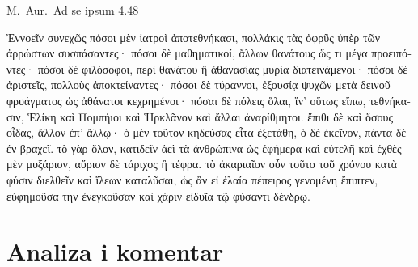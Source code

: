 M.~Aur.\ Ad se ipsum 4.48


\medskip


{\large

\begin{greek}

\noindent  Ἐννοεῖν συνεχῶς πόσοι μὲν ἰατροὶ ἀποτεθνήκασι, πολλάκις τὰς ὀφρῦς ὑπὲρ τῶν ἀρρώστων συσπάσαντες· πόσοι δὲ μαθηματικοί, ἄλλων θανάτους ὥς τι μέγα προειπόντες· πόσοι δὲ φιλόσοφοι, περὶ θανάτου ἢ ἀθανασίας μυρία διατεινάμενοι· πόσοι δὲ ἀριστεῖς, πολλοὺς ἀποκτείναντες· πόσοι δὲ τύραννοι, ἐξουσίᾳ ψυχῶν μετὰ δεινοῦ φρυάγματος ὡς ἀθάνατοι κεχρημένοι· πόσαι δὲ πόλεις ὅλαι, ἵν' οὕτως εἴπω, τεθνήκασιν, Ἑλίκη καὶ Πομπήιοι καὶ Ἡρκλᾶνον καὶ ἄλλαι ἀναρίθμητοι. ἔπιθι δὲ καὶ ὅσους οἶδας, ἄλλον ἐπ' ἄλλῳ· ὁ μὲν τοῦτον κηδεύσας εἶτα ἐξετάθη, ὁ δὲ ἐκεῖνον, πάντα δὲ ἐν βραχεῖ. τὸ γὰρ ὅλον, κατιδεῖν ἀεὶ τὰ ἀνθρώπινα ὡς ἐφήμερα καὶ εὐτελῆ καὶ ἐχθὲς μὲν μυξάριον, αὔριον δὲ τάριχος ἢ τέφρα. τὸ ἀκαριαῖον οὖν τοῦτο τοῦ χρόνου κατὰ φύσιν διελθεῖν καὶ ἵλεων καταλῦσαι, ὡς ἂν εἰ ἐλαία πέπειρος γενομένη ἔπιπτεν, εὐφημοῦσα τὴν ἐνεγκοῦσαν καὶ χάριν εἰδυῖα τῷ φύσαντι δένδρῳ.


\end{greek}

}


\section*{Analiza i komentar}


